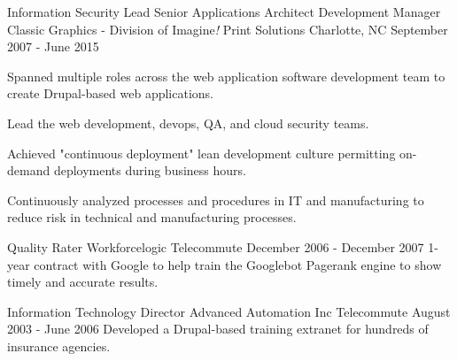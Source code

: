 \begin{cventries}
\cventry
{Information Security Lead\newline
Senior Applications Architect\newline
Development Manager}
{Classic Graphics - Division of Imagine{\it !} Print Solutions} %
{Charlotte, NC} %
{September 2007 - June 2015} %
{
Spanned multiple roles across the web application software development team to create Drupal-based web applications.
\begin{cvitems}
\item[]
\item {Lead the web development, devops, QA, and cloud security teams.}
\item {Achieved "continuous deployment" lean development culture permitting on-demand deployments during business hours.}
\item {Continuously analyzed processes and procedures in IT and manufacturing to reduce risk in technical and manufacturing processes.}
\end{cvitems}
}


\cventry
{Quality Rater}
{Workforcelogic}
{Telecommute}
{December 2006 - December 2007} %
{ %
1-year contract with Google to help train the Googlebot Pagerank engine to show timely and accurate results.
}


\cventry
{Information Technology Director}
{Advanced Automation Inc}
{Telecommute}
{August 2003 - June 2006} %
{ %
Developed a Drupal-based training extranet for hundreds of insurance agencies.
}


\end{cventries}
